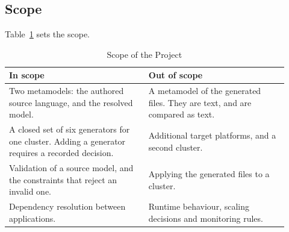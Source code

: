 \subsection{Scope}

Table~\ref{tab:scope} sets the scope.

\begin{table}[!htbp]
\centering
\small
\begin{tabular}{>{\raggedright\arraybackslash}p{0.46\linewidth}>{\raggedright\arraybackslash}p{0.46\linewidth}}
\hline
\textbf{In scope} & \textbf{Out of scope} \\
\hline
Two metamodels: the authored source language, and the resolved model. &
  A metamodel of the generated files. They are text, and are compared as text. \\
A closed set of six generators for one cluster. Adding a generator requires a recorded decision. &
  Additional target platforms, and a second cluster. \\
Validation of a source model, and the constraints that reject an invalid one. &
  Applying the generated files to a cluster. \\
Dependency resolution between applications. &
  Runtime behaviour, scaling decisions and monitoring rules. \\
\hline
\end{tabular}
\caption{Scope of the Project}
\label{tab:scope}
\end{table}
